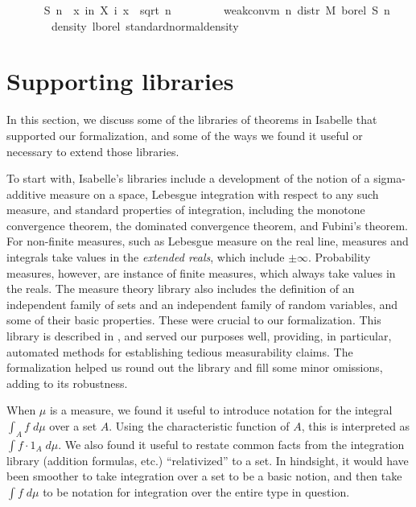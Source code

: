 \documentclass{article}
\begin{document}
\begin{isabellebody}
\ \ \isanewline
\ \ \ \ {\isachardoublequoteopen}S\ n\ {\isasymequiv}\ {\isasymlambda}x{\isachardot}\  {\isacharparenleft}{\isasymSum}i{\isacharless}n{\isachardot}\ X\ i\ x{\isacharparenright}\ {\isacharslash}\ sqrt\ {\isacharparenleft}n\ {\isacharasterisk}\ {\isasymsigma}\isanewline
\ \ \isanewline
\ \ \ \ {\isachardoublequoteopen}weak{\isacharunderscore}conv{\isacharunderscore}m\ {\isacharparenleft}{\isasymlambda}n{\isachardot}\ distr\ M\ borel\ {\isacharparenleft}S\ n{\isacharparenright}{\isacharparenright}\isanewline
\ \ \ \ \ \ \ \ {\isacharparenleft}density\ lborel\ standard{\isacharunderscore}normal{\isacharunderscore}density{\isacharparenright}{\isachardoublequoteclose}\isanewline 
\end{isabellebody}

\section{Supporting libraries}

In this section, we discuss some of the libraries of theorems in Isabelle that supported our formalization, and some of the ways we found it useful or necessary to extend those libraries. 

To start with, Isabelle's libraries include a development of the notion of a sigma-additive measure on a space, Lebesgue integration with respect to any such measure, and standard properties of integration, including the monotone convergence theorem, the dominated convergence theorem, and Fubini's theorem. For non-finite measures, such as Lebesgue measure on the real line, measures and integrals take values in the \emph{extended reals}, which include $\pm \infty$. Probability measures, however, are instance of finite measures, which always take values in the reals. The measure theory library also includes the definition of an independent family of sets and an independent family of random variables, and some of their basic properties. These were crucial to our formalization.  This library is described in \cite{hoelzl2012thesis,hoelzl2011measure}, and served our purposes well, providing, in particular, automated methods for establishing tedious measurability claims. The formalization helped us round out the library and fill some minor omissions, adding to its robustness.

When $\mu$ is a measure,  we found it useful to introduce notation for the integral $\int_A f \; d\mu$ over a set $A$. Using the characteristic function of $A$, this is interpreted as $\int f \cdot 1_A \; d\mu$. We also found it useful to restate common facts from the integration library (addition formulas, etc.) ``relativized'' to a set. In hindsight, it would have been smoother to take integration over a set to be a basic notion, and then take $\int f \; d\mu$ to be notation for integration over the entire type in question.
\end{document}

